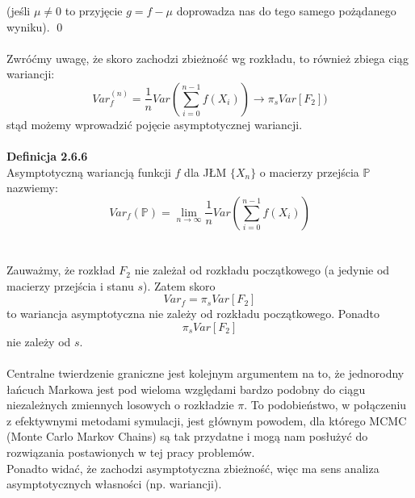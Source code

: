 \documentclass[a4paper]{article}
\begin{document}
(jeśli $\mu \neq 0$ to przyjęcie $g = f - \mu$ doprowadza nas do tego samego pożądanego wyniku). \qed
\\\\
Zwróćmy uwagę, że skoro zachodzi zbieżność wg rozkładu, to również zbiega ciąg wariancji:
$$Var_f^{(n)} = \frac{1}{n} Var\left(\sum\limits_{i=0}^{n-1} f(X_i)\right) \to \pi_s Var[F_2])$$
stąd możemy wprowadzić pojęcie asymptotycznej wariancji.\\\\
\textbf{Definicja 2.6.6}\\
Asymptotyczną wariancją funkcji $f$ dla JŁM $\{X_n\}$ o macierzy przejścia $\mathbb{P}$ nazwiemy:
$$Var_{f}(\mathbb{P}) = \lim\limits_{n \to \infty} \frac{1}{n} Var\left(\sum\limits_{i=0}^{n-1} f(X_i)\right)$$
\\\\
Zauważmy, że rozkład $F_2$ nie zależał od rozkładu początkowego (a jedynie od macierzy przejścia i stanu $s$). Zatem skoro $$Var_f = \pi_s Var[F_2]$$
to wariancja asymptotyczna nie zależy od rozkładu początkowego. Ponadto
$$\pi_s Var[F_2]$$
nie zależy od $s$.\\\\
Centralne twierdzenie graniczne jest kolejnym argumentem na to, że jednorodny łańcuch Markowa jest pod wieloma względami bardzo podobny do ciągu niezależnych zmiennych losowych o rozkładzie $\pi$. To podobieństwo, w połączeniu z efektywnymi metodami symulacji, jest głównym powodem, dla którego MCMC (Monte Carlo Markov Chains) są tak przydatne i mogą nam posłużyć do rozwiązania postawionych w tej pracy problemów.\\
Ponadto widać, że zachodzi asymptotyczna zbieżność, więc ma sens analiza asymptotycznych własności (np. wariancji).
\end{document}
